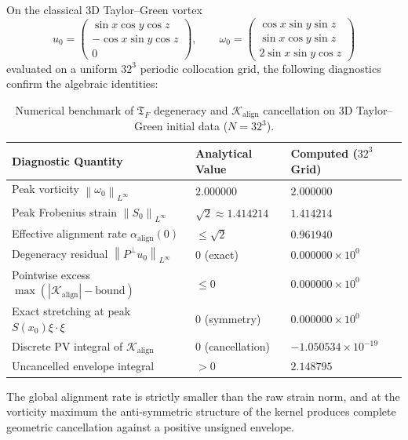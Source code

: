 \documentclass[11pt,reqno]{amsart}
\theoremstyle{definition}
\newcommand{\TF}{\mathfrak{T}_F}
\newcommand{\Pperp}{P^\perp}
\newcommand{\norm}[1]{\left\| #1 \right\|}
\begin{document}
On the classical 3D Taylor--Green vortex
\[
u_0 = \begin{pmatrix}\sin x\cos y\cos z\\ -\cos x\sin y\cos z\\ 0\end{pmatrix},\qquad
\omega_0 = \begin{pmatrix}\cos x\sin y\sin z\\ \sin x\cos y\sin z\\ 2\sin x\sin y\cos z\end{pmatrix}
\]
evaluated on a uniform $32^3$ periodic collocation grid, the following diagnostics confirm the algebraic identities:

\begin{table}[htbp]
\centering
\caption{Numerical benchmark of $\TF$ degeneracy and $\mathcal{K}_{\mathrm{align}}$ cancellation on 3D Taylor--Green initial data ($N=32^3$).}
\label{tab:TG_benchmark}
\begin{tabular}{@{}lll@{}}
\toprule
\textbf{Diagnostic Quantity} & \textbf{Analytical Value} & \textbf{Computed ($32^3$ Grid)} \\
\midrule
Peak vorticity $\norm{\omega_0}_{L^\infty}$ & $2.000000$ & $2.000000$ \\
Peak Frobenius strain $\norm{S_0}_{L^\infty}$ & $\sqrt{2}\approx 1.414214$ & $1.414214$ \\
Effective alignment rate $\alpha_{\mathrm{align}}(0)$ & $\le\sqrt{2}$ & $0.961940$ \\
Degeneracy residual $\norm{\Pperp u_0}_{L^\infty}$ & $0$ (exact) & $0.000000\times 10^{0}$ \\
Pointwise excess $\max(|\mathcal{K}_{\mathrm{align}}|-\text{bound})$ & $\le 0$ & $0.000000\times 10^{0}$ \\
Exact stretching at peak $S(x_0)\xi\cdot\xi$ & $0$ (symmetry) & $0.000000\times 10^{0}$ \\
Discrete PV integral of $\mathcal{K}_{\mathrm{align}}$ & $0$ (cancellation) & $-1.050534\times 10^{-19}$ \\
Uncancelled envelope integral & $>0$ & $2.148795$ \\
\bottomrule
\end{tabular}
\end{table}

The global alignment rate is strictly smaller than the raw strain norm, and at the vorticity maximum the anti-symmetric structure of the kernel produces complete geometric cancellation against a positive unsigned envelope.
\end{document}
